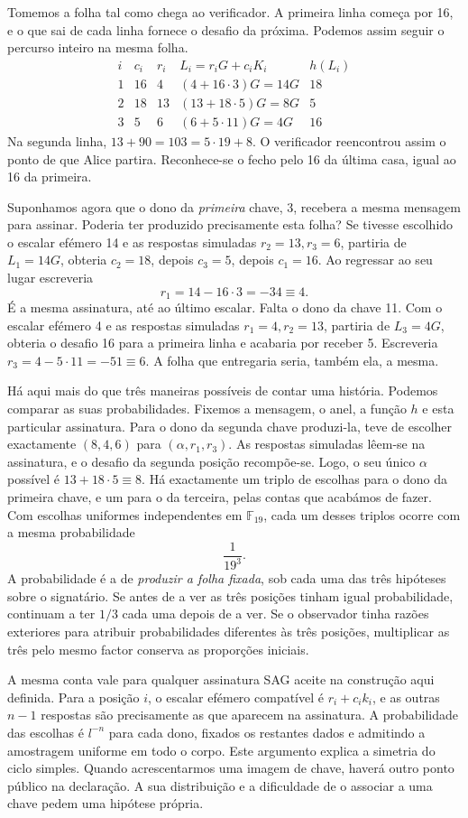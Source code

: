 Tomemos a folha tal como chega ao verificador. A primeira linha começa
por 16, e o que sai de cada linha fornece o desafio da próxima.
Podemos assim seguir o percurso inteiro na mesma folha.
\[
\begin{array}{c|r|r|l|r}
 i&c_i&r_i&L_i=r_iG+c_iK_i& h(L_i)\\ \hline
 1&16&4 &(4+16\cdot3)G=14G&18\\
 2&18&13&(13+18\cdot5)G=8G&5\\
 3&5&6  &(6+5\cdot11)G=4G&16
\end{array}
\]
Na segunda linha, \(13+90=103=5\cdot19+8\). O verificador
reencontrou assim o ponto de que Alice partira. Reconhece-se o fecho
pelo 16 da última casa, igual ao 16 da primeira.

Suponhamos agora que o dono da \emph{primeira} chave, 3, recebera a
mesma mensagem para assinar. Poderia ter produzido precisamente esta
folha? Se tivesse escolhido o escalar efémero 14 e as respostas
simuladas \(r_2=13,r_3=6\), partiria de \(L_1=14G\), obteria
\(c_2=18\), depois \(c_3=5\), depois \(c_1=16\). Ao regressar
ao seu lugar escreveria
\[
                     r_1=14-16\cdot3=-34\equiv4 .
\]
É a mesma assinatura, até ao último escalar. Falta o dono da chave
11. Com o escalar efémero 4 e as respostas simuladas
\(r_1=4,r_2=13\), partiria de \(L_3=4G\), obteria o desafio 16
para a primeira linha e acabaria por receber 5. Escreveria
\(r_3=4-5\cdot11=-51\equiv6\). A folha que entregaria seria,
também ela, a mesma.

Há aqui mais do que três maneiras possíveis de contar uma história.
Podemos comparar as suas probabilidades. Fixemos a mensagem, o anel,
a função \(h\) e esta particular assinatura. Para o dono da segunda
chave produzi-la, teve de escolher exactamente \((8,4,6)\) para
\((\alpha,r_1,r_3)\). As respostas simuladas lêem-se na assinatura,
e o desafio da segunda posição recompõe-se. Logo, o seu único
\(\alpha\) possível é \(13+18\cdot5\equiv8\).
Há exactamente um triplo de escolhas para o dono da primeira chave,
e um para o da terceira, pelas contas que acabámos de fazer.
Com escolhas uniformes independentes em \(\mathbb F_{19}\), cada
um desses triplos ocorre com a mesma probabilidade
\[
                          \frac{1}{19^3}.
\]
A probabilidade é a de \emph{produzir a folha fixada}, sob cada uma
das três hipóteses sobre o signatário. Se antes de a ver as três
posições tinham igual probabilidade, continuam a ter \(1/3\)
cada uma depois de a ver. Se o observador tinha razões exteriores
para atribuir probabilidades diferentes às três posições, multiplicar
as três pelo mesmo factor conserva as proporções iniciais.

A mesma conta vale para qualquer assinatura SAG aceite na construção
aqui definida. Para a posição \(i\), o escalar efémero compatível é
\(r_i+c_i k_i\), e as outras \(n-1\) respostas são precisamente as
que aparecem na assinatura. A probabilidade das escolhas é
\(l^{-n}\) para cada dono, fixados os restantes dados e admitindo
a amostragem uniforme em todo o corpo. Este argumento explica a
simetria do ciclo simples. Quando acrescentarmos uma imagem de chave,
haverá outro ponto público na declaração. A sua distribuição e a
dificuldade de o associar a uma chave pedem uma hipótese própria.
